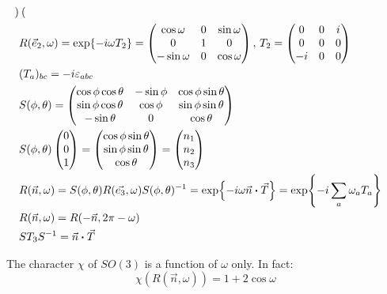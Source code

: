 \documentclass{article}
\begin{document}
\begin{align}
\begin{pmatrix}
    \end{pmatrix}\\
    & R(\vec{e}_2,\omega) = \exp{-i\omega T_2} = \begin{pmatrix}
        \cos{\omega} & 0 & \sin{\omega} \\
        0 & 1 & 0 \\
    -\sin{\omega} & 0 & \cos{\omega} 
    \end{pmatrix},\, T_2 = \begin{pmatrix}
        0 & 0 & i \\
        0 & 0 & 0 \\
        -i & 0 & 0
    \end{pmatrix}\\
    & (T_a)_{bc}= -i\varepsilon_{abc} \\
    & S(\phi,\theta) = \begin{pmatrix}
    \cos{\phi}\cos{\theta} & -\sin{\phi} & \cos{\phi}\sin{\theta} \\
    \sin{\phi}\cos{\theta} & \cos{\phi} & \sin{\phi}\sin{\theta} \\
    -\sin{\theta} & 0 & \cos{\theta}
    \end{pmatrix} \\
    & S(\phi,\theta) \begin{pmatrix}
        0 \\ 0 \\ 1
    \end{pmatrix} = \begin{pmatrix}
        \cos{\phi}\sin{\theta} \\ \sin{\phi}\sin{\theta} \\ \cos{\theta}
    \end{pmatrix} = \begin{pmatrix}
        n_1 \\ n_2 \\ n_3
    \end{pmatrix}\\
    & R(\vec{n},\omega) =
        S(\phi,\theta)R(\vec{e_3},\omega)S(\phi,\theta)^{-1}
        =\exp{-i\omega\vec{n}\vdot\vec{T}}
        = \exp{-i\sum_a \omega_a T_a} \\
    & R(\vec{n},\omega) = R(-\vec{n},2\pi-\omega) \\
    & S T_3 S^{-1} = \vec{n}\vdot\vec{T}
\end{align}
\begin{fact}
    The character $\chi$ of $SO(3)$ is a function of $\omega$ only. In
    fact:
    \begin{equation}
        \chi(R(\vec{n},\omega)) = 1+2\cos{\omega}
    \end{equation}
\end{fact}
\end{document}
